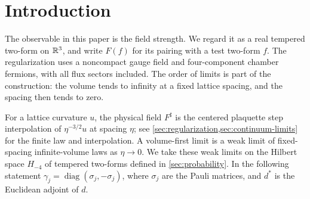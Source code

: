 \section{Introduction}

The observable in this paper is the field strength. We regard it as a real
tempered two-form on $\mathbb R^3$, and write $F(f)$ for its pairing with a test
two-form $f$. The regularization uses a noncompact gauge field and
four-component chamber fermions, with all flux sectors included.
The order of limits is part of the construction: the volume tends to
infinity at a fixed lattice spacing, and the spacing then tends to zero.

For a lattice curvature $u$, the physical field $F^\sharp$ is the
centered plaquette step interpolation of $\eta^{-3/2}u$ at spacing
$\eta$; see \cref{sec:regularization,sec:continuum-limits} for the
finite law and interpolation. A volume-first limit is a weak limit
of fixed-spacing infinite-volume laws as $\eta\to0$. We take these
weak limits on the Hilbert space $H_{-4}$ of tempered two-forms
defined in \cref{sec:probability}. In the following statement
$\gamma_j=\operatorname{diag}(\sigma_j,-\sigma_j)$, where $\sigma_j$
are the Pauli matrices, and $d^*$ is the Euclidean adjoint of $d$.

